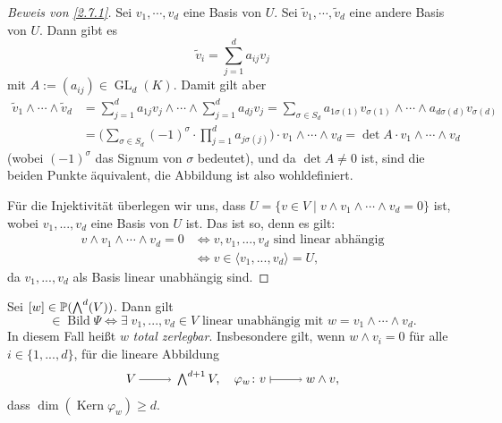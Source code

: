 \documentclass[a4paper,12pt,index=toc]{scrbook}
\theoremstyle{keinenummern} %
\def\P{\mathbb{P}}
\newcommand{\Kern}{\operatorname{Kern}}
\newcommand{\Bild}{\operatorname{Bild}}
\newcommand{\GL}{\operatorname{GL}}
\renewcommand{\dotsc}{\ensuremath{\!...}}
\newcommand{\schlange}[1]{\widetilde{#1}}
\let\grassmann\bigwedge
\def\bigwedge{\begingroup\textstyle\grassmann\endgroup}
\begin{document}
\begin{proof}[Beweis von \cref{2.7.1}]
Sei $v_1,\dotsm ,v_d$ eine Basis von $U$.
Sei $\schlange{v}_{1},\dotsm,\schlange{v}_{d}$ eine andere Basis von $U$. Dann gibt es
\begin{equation*}\schlange{v}_{i}=\sum_{j=1}^{d}a_{ij}v_{j}\end{equation*}
mit $A:=(a_{ij})\in\GL_{d}(K)$. Damit gilt aber
\begin{align*}
\schlange{v}_{1}\wedge\dotsm\wedge\schlange{v}_{d}&=\sum_{j=1}^{d}a_{1j}v_{j}\wedge\dotsm\wedge\sum_{j=1}^{d}a_{dj}v_{j}=\sum_{\sigma\in S_{d}}a_{1\sigma(1)}v_{\sigma(1)}\wedge\dotsm\wedge a_{d\sigma(d)}v_{\sigma(d)}\\
&=\biggl(\sum_{\sigma\in S_{d}}(-1)^{\sigma}\cdot\prod_{j=1}^{d}a_{j\sigma(j)}\biggr)\cdot v_{1}\wedge\dotsm\wedge v_{d}=\det A\cdot v_{1}\wedge\dotsm\wedge v_{d}
\end{align*}
(wobei $(-1)^{\sigma}$ das Signum von $\sigma$ bedeutet), und da $\det A\neq 0$ ist, sind die beiden Punkte äquivalent, die Abbildung ist also wohldefiniert.

Für die Injektivität überlegen wir uns, dass $U=\{v\in V\mid v\wedge v_{1}\wedge\dotsm\wedge v_{d}=0\}$ ist, wobei $v_{1},\dotsc, v_{d}$ eine Basis von $U$ ist. Das ist so, denn es gilt:
\begin{align*}
v\wedge v_{1}\wedge\dotsm\wedge v_{d}=0&\iff v,v_{1},\dotsc,v_{d}\text{ sind linear abhängig}\\
&\iff v\in\langle v_{1},\dotsc,v_{d}\rangle=U,
\end{align*}
da $v_{1},\dotsc,v_{d}$ als Basis linear unabhängig sind.
\end{proof}

\begin{db}\label{2.7.2}
Sei $[w]\in\P(\bigwedge^{d}(V))$. Dann gilt
\begin{equation*}[w]\in\Bild\Psi\iff\exists\; v_{1},\dotsc,v_{d}\in V\text{ linear unabhängig mit }w=v_{1}\wedge\dotsm\wedge v_{d}.\end{equation*}
In diesem Fall heißt $w$ \emph{total zerlegbar}. Insbesondere gilt, wenn $w\wedge v_{i}=0$ für alle $i\in\{1,\dotsc,d\}$, für die lineare Abbildung
\begin{equation*}V\ra\bigwedge^{d+1}V,\quad \varphi_{w}\colon v\mapsto w\wedge v,\end{equation*}
dass $\dim(\Kern\varphi_{w})\geq d$.
\end{db}
\end{document}
